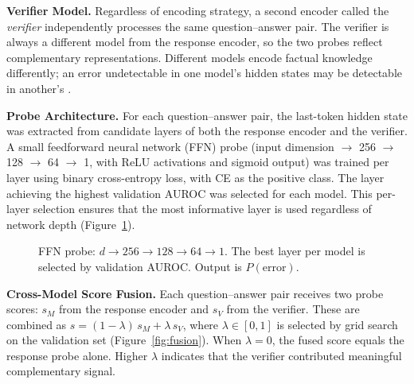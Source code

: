 \documentclass[12pt,twocolumn]{article}
\begin{document}
\textbf{Verifier Model.}
Regardless of encoding strategy, a second encoder called the
\emph{verifier} independently processes the same question--answer
pair. The verifier is always a different model from the response
encoder, so the two probes reflect complementary representations.
Different models encode factual knowledge differently; an error
undetectable in one model's hidden states may be detectable in
another's \citep{tan2025consistent}.

\textbf{Probe Architecture.}
For each question--answer pair, the last-token hidden state was
extracted from candidate layers of both the response encoder and the
verifier. A small feedforward neural network (FFN) probe (input
dimension $\to$ 256 $\to$ 128 $\to$ 64 $\to$ 1, with ReLU
activations and sigmoid output) was trained per layer using binary
cross-entropy loss, with CE as the positive class. The layer
achieving the highest validation AUROC was selected for each model.
This per-layer selection ensures that the most informative layer is
used regardless of network depth (Figure~\ref{fig:probe}).

\begin{figure}[H]
\centering
{}
\caption{FFN probe: $d \to 256 \to 128 \to 64 \to 1$. The best
layer per model is selected by validation AUROC. Output is
$P(\text{error})$.}
\label{fig:probe}
\end{figure}

\textbf{Cross-Model Score Fusion.}
Each question--answer pair receives two probe scores: $s_M$ from the
response encoder and $s_V$ from the verifier. These are combined as
$s = (1{-}\lambda)\,s_M + \lambda\,s_V$, where $\lambda \in [0,1]$
is selected by grid search on the validation set
(Figure~\ref{fig:fusion}). When $\lambda = 0$, the fused score
equals the response probe alone. Higher $\lambda$ indicates that the
verifier contributed meaningful complementary signal.
\end{document}
